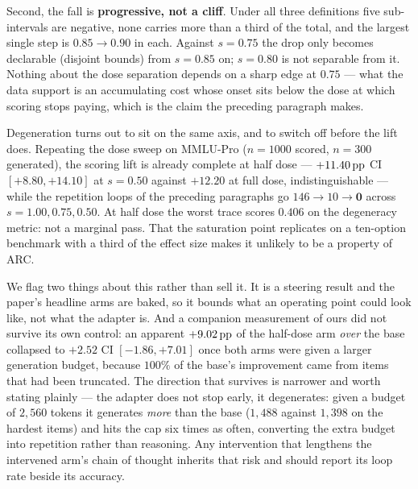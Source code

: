 Second, the fall is \textbf{progressive, not a cliff}. Under all three definitions
five sub-intervals are negative, none carries more than a third of the total, and
the largest single step is $0.85{\rightarrow}0.90$ in each. Against $s{=}0.75$ the
drop only becomes declarable (disjoint bounds) from $s{=}0.85$ on; $s{=}0.80$ is
not separable from it. Nothing about the dose separation depends on a sharp edge at
$0.75$ --- what the data support is an accumulating cost whose onset sits below the
dose at which scoring stops paying, which is the claim the preceding paragraph
makes.

Degeneration turns out to sit on the same axis, and to switch off before the lift
does. Repeating the dose sweep on MMLU-Pro ($n{=}1000$ scored, $n{=}300$ generated),
the scoring lift is already complete at half dose --- $+11.40\,\mathrm{pp}$ CI
$[+8.80, +14.10]$ at $s{=}0.50$ against $+12.20$ at full dose, indistinguishable ---
while the repetition loops of the preceding paragraphs go $146 \rightarrow 10
\rightarrow \mathbf{0}$ across $s = 1.00, 0.75, 0.50$. At half dose the worst trace
scores $0.406$ on the degeneracy metric: not a marginal pass. That the saturation
point replicates on a ten-option benchmark with a third of the effect size makes it
unlikely to be a property of ARC.

We flag two things about this rather than sell it. It is a steering result and the
paper's headline arms are baked, so it bounds what an operating point could look
like, not what the adapter is. And a companion measurement of ours did not survive
its own control: an apparent $+9.02\,\mathrm{pp}$ of the half-dose arm \emph{over} the base
collapsed to $+2.52$ CI $[-1.86, +7.01]$ once both arms were given a larger
generation budget, because $100\%$ of the base's improvement came from items that
had been truncated. The direction that survives is narrower and worth stating
plainly --- the adapter does not stop early, it degenerates: given a budget of
$2{,}560$ tokens it generates \emph{more} than the base ($1{,}488$ against $1{,}398$ on the
hardest items) and hits the cap six times as often, converting the extra budget into
repetition rather than reasoning. Any intervention that lengthens the intervened
arm's chain of thought inherits that risk and should report its loop rate beside its
accuracy.

